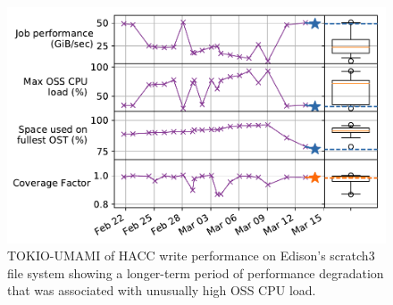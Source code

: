 \begin{figure}[t]
    \centering
    \includegraphics[width=1.0\columnwidth]{figs/umami-scratch3-hacc-write-long-term.pdf}
    \caption{TOKIO-UMAMI of HACC write performance on Edison's scratch3 file system showing a longer-term period of performance degradation that was associated with unusually high OSS CPU load.}
    \label{fig:umami-scratch3-hacc-write-long-term}
\end{figure}

% 
% 
% 
% 

